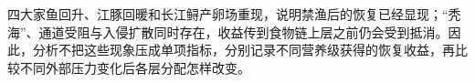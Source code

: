 四大家鱼回升、江豚回暖和长江鲟产卵场重现，说明禁渔后的恢复已经显现；“秃海”、通道受阻与入侵扩散同时存在，收益传到食物链上层之前仍会受到抵消。因此，分析不把这些现象压成单项指标，分别记录不同营养级获得的恢复收益，再比较不同外部压力变化后各层分配怎样改变。
